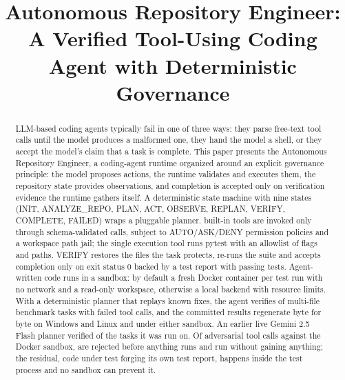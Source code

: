 \documentclass[conference]{IEEEtran}
\begin{document}
\title{Autonomous Repository Engineer:\\
A Verified Tool-Using Coding Agent with Deterministic Governance}

\author{
}

\maketitle

\begin{abstract}
LLM-based coding agents typically fail in one of three ways: they parse
free-text tool calls until the model produces a malformed one, they hand the
model a shell, or they accept the model's claim that a task is complete.
This paper presents the Autonomous Repository Engineer, a coding-agent
runtime organized around an explicit governance principle: the model
proposes actions, the runtime validates and executes them, the repository
state provides observations, and completion is accepted only on verification
evidence the runtime gathers itself. A deterministic state machine with nine
states (INIT, ANALYZE\_REPO, PLAN, ACT, OBSERVE, REPLAN, VERIFY, COMPLETE,
FAILED) wraps a pluggable planner. \ToolCount{} built-in tools are invoked only through
schema-validated calls, subject to AUTO/ASK/DENY permission policies and a
workspace path jail; the single execution tool runs pytest with an
allowlist of flags and paths. VERIFY restores the files the task protects,
re-runs the suite and accepts completion only on exit status 0 backed by a
test report with passing tests. Agent-written code runs in a sandbox: by
default a fresh Docker container per test run with no network and a
read-only workspace, otherwise a local backend with resource limits. With a
deterministic planner that replays known fixes, the agent verifies
\BenchVerified{} of \BenchTasks{} multi-file benchmark tasks with
\BenchFailedCalls{} failed tool calls, and the committed results regenerate
byte for byte on Windows and Linux and under either sandbox. An earlier live
Gemini 2.5 Flash planner verified \LiveVerified{} of the \LiveTasks{} tasks
it was run on. Of \JailDockerTotal{} adversarial tool calls against the
Docker sandbox, \JailDockerRejected{} are rejected before anything runs and
\JailDockerContained{} run without gaining anything; the
\JailDockerResidual{} residual, code under test forging its own test
report, happens inside the test process and no sandbox can prevent it.
\end{abstract}
\end{document}
